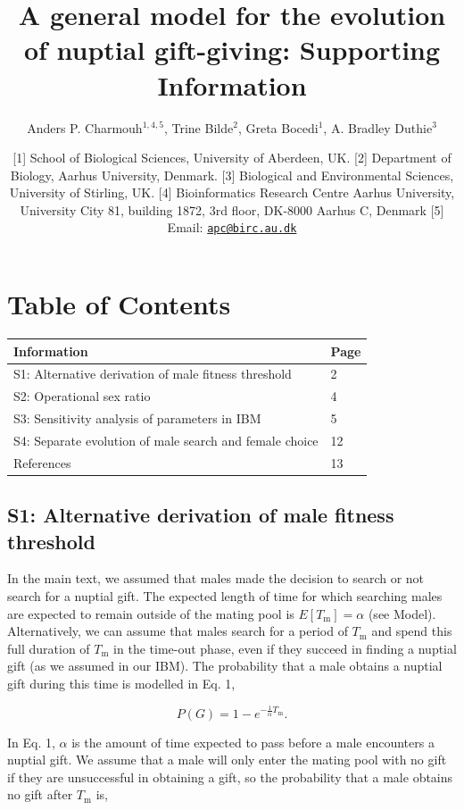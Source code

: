 \documentclass[
]{article}
\title{A general model for the evolution of nuptial gift-giving:
Supporting Information}
\author{Anders P. Charmouh\(^{1,4, 5}\), Trine Bilde\(^{2}\), Greta
Bocedi\(^{1}\), A. Bradley Duthie\(^{3}\)}
\date{{[}1{]} School of Biological Sciences, University of Aberdeen, UK.
{[}2{]} Department of Biology, Aarhus University, Denmark. {[}3{]}
Biological and Environmental Sciences, University of Stirling, UK.
{[}4{]} Bioinformatics Research Centre Aarhus University, University
City 81, building 1872, 3rd floor, DK-8000 Aarhus C, Denmark {[}5{]}
Email: \href{mailto:apc@birc.au.dk}{\nolinkurl{apc@birc.au.dk}}}
\begin{document}
\maketitle

\hypertarget{table-of-contents}{%
\section{Table of Contents}\label{table-of-contents}}

\begin{longtable}[]{@{}ll@{}}
\toprule
Information & Page \\
\midrule
\endhead
S1: Alternative derivation of male fitness threshold & 2 \\
S2: Operational sex ratio & 4 \\
S3: Sensitivity analysis of parameters in IBM & 5 \\
S4: Separate evolution of male search and female choice & 12 \\
References & 13 \\
\bottomrule
\end{longtable}

\clearpage

\hypertarget{s1-alternative-derivation-of-male-fitness-threshold}{%
\subsection{S1: Alternative derivation of male fitness
threshold}\label{s1-alternative-derivation-of-male-fitness-threshold}}

In the main text, we assumed that males made the decision to search or
not search for a nuptial gift. The expected length of time for which
searching males are expected to remain outside of the mating pool is
\(E[T_{\mathrm{m}}] = \alpha\) (see Model). Alternatively, we can assume
that males search for a period of \(T_{\mathrm{m}}\) and spend this full
duration of \(T_{\mathrm{m}}\) in the time-out phase, even if they
succeed in finding a nuptial gift (as we assumed in our IBM). The
probability that a male obtains a nuptial gift during this time is
modelled in Eq. 1,

\[P(G) = 1 - e^{-\frac{1}{\alpha}T_{\mathrm{m}}}.\]

In Eq. 1, \(\alpha\) is the amount of time expected to pass before a
male encounters a nuptial gift. We assume that a male will only enter
the mating pool with no gift if they are unsuccessful in obtaining a
gift, so the probability that a male obtains no gift after
\(T_{\mathrm{m}}\) is,
\end{document}
